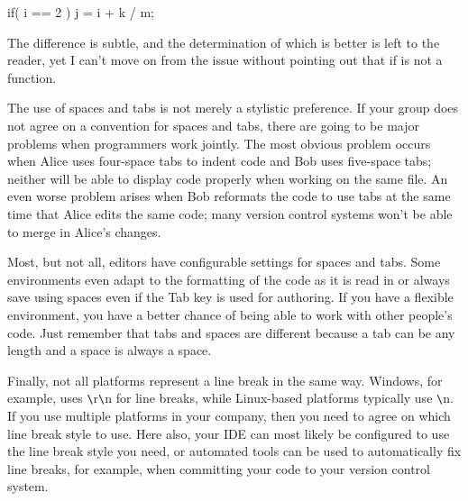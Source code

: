 \begin{cpp}
if( i == 2 ) {
    j = i + k / m;
}
\end{cpp}

The difference is subtle, and the determination of which is better is left to the reader, yet I can’t move on from the issue without pointing out that if is not a function.


The use of spaces and tabs is not merely a stylistic preference. If your group does not agree on a convention for spaces and tabs, there are going to be major problems when programmers work jointly. The most obvious problem occurs when Alice uses four-space tabs to indent code and Bob uses five-space tabs; neither will be able to display code properly when working on the same file. An even worse problem arises when Bob reformats the code to use tabs at the same time that Alice edits the same code; many version control systems won’t be able to merge in Alice’s changes.

Most, but not all, editors have configurable settings for spaces and tabs. Some environments even adapt to the formatting of the code as it is read in or always save using spaces even if the Tab key is used for authoring. If you have a flexible environment, you have a better chance of being able to work with other people’s code. Just remember that tabs and spaces are different because a tab can be any length and a space is always a space.

Finally, not all platforms represent a line break in the same way. Windows, for example, uses \verb|\|r\verb|\|n for line breaks, while Linux-based platforms typically use \verb|\|n. If you use multiple platforms in your company, then you need to agree on which line break style to use. Here also, your IDE can most likely be configured to use the line break style you need, or automated tools can be used to automatically fix line breaks, for example, when committing your code to your version control system.